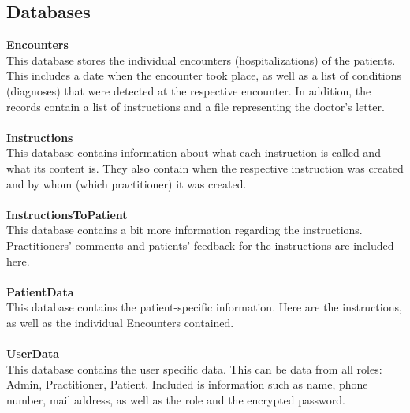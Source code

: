 \documentclass[]{report}
\begin{document}
\subsection{Databases}
\textbf{Encounters}\\
This database stores the individual encounters (hospitalizations) of the patients. This includes a date when the encounter took place, as well as a list of conditions (diagnoses) that were detected at the respective encounter. In addition, the records contain a list of instructions and a file representing the doctor's letter.\\\\
\textbf{Instructions}\\
This database contains information about what each instruction is called and what its content is. They also contain when the respective instruction was created and by whom (which practitioner) it was created.\\\\
\textbf{InstructionsToPatient}\\
This database contains a bit more information regarding the instructions. Practitioners' comments and patients' feedback for the instructions are included here.\\\\
\textbf{PatientData}\\
This database contains the patient-specific information. Here are the instructions, as well as the individual Encounters contained.\\\\
\textbf{UserData}\\
This database contains the user specific data. This can be data from all roles: Admin, Practitioner, Patient. Included is information such as name, phone number, mail address, as well as the role and the encrypted password.
\end{document}
